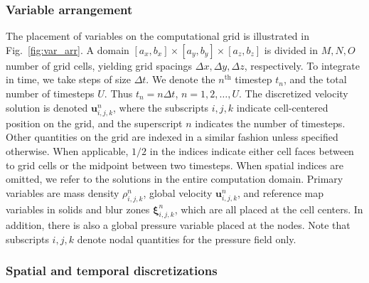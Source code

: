 \documentclass[times, 10pt]{article}
\renewcommand{\vec}[1]{\mathbf{#1}}
\newcommand{\vu}{\vec{u}}
\newcommand{\vxi}{\boldsymbol\xi}
\begin{document}
\subsubsection*{Variable arrangement}

The placement of variables on the computational grid is illustrated in Fig.~\ref{fig:var_arr}.
A domain $[a_x, b_x] \times [a_y, b_y] \times [a_z, b_z]$ is divided in $M, N, O$ number of grid cells,
yielding grid spacings $\Delta x, \Delta y, \Delta z$, respectively.
To integrate in time, we take steps of size $\Delta t$.
We denote the $n^\text{th}$ timestep $t_n$, and the total number of timesteps $U$.
Thus $t_n = n \Delta t$, $n=1,2,\ldots,U$.
The discretized velocity solution is denoted $\vu_{i,j,k}^n$, where the subscripts $i, j, k$ indicate cell-centered position on the grid,
and the superscript $n$ indicates the number of timesteps.
Other quantities on the grid are indexed in a similar fashion unless specified otherwise.
When applicable, $1/2$ in the indices indicate either cell faces between to grid cells or the midpoint between two timesteps.
When spatial indices are omitted, we refer to the solutions in the entire computation domain.
Primary variables are mass density $\rho_{i,j,k}^n$, global velocity $\vu_{i,j,k}^n$, and reference map variables in solids and blur zones $\vxi_{i,j,k}^n$, which are all placed at the cell centers.
In addition, there is also a global pressure variable  placed at the nodes. Note that subscripts $i,j,k$ denote nodal quantities for the pressure field only.

\subsubsection*{Spatial and temporal discretizations}
\end{document}
